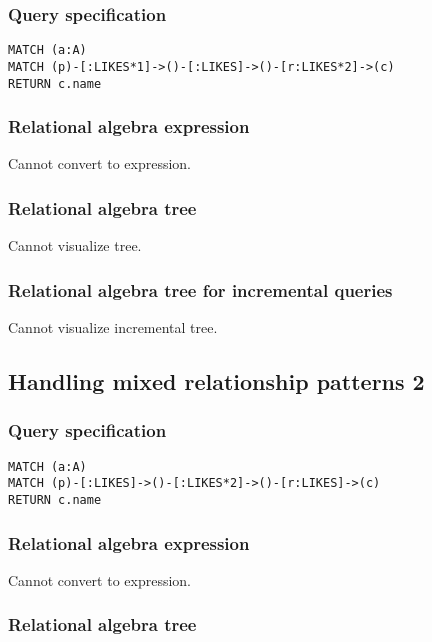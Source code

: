 \subsubsection*{Query specification}

\begin{lstlisting}
MATCH (a:A)
MATCH (p)-[:LIKES*1]->()-[:LIKES]->()-[r:LIKES*2]->(c)
RETURN c.name
\end{lstlisting}

\subsubsection*{Relational algebra expression}

Cannot convert to expression.

\subsubsection*{Relational algebra tree}

Cannot visualize tree.

\subsubsection*{Relational algebra tree for incremental queries}

Cannot visualize incremental tree.

\subsection{Handling mixed relationship patterns 2}

\subsubsection*{Query specification}

\begin{lstlisting}
MATCH (a:A)
MATCH (p)-[:LIKES]->()-[:LIKES*2]->()-[r:LIKES]->(c)
RETURN c.name
\end{lstlisting}

\subsubsection*{Relational algebra expression}

Cannot convert to expression.

\subsubsection*{Relational algebra tree}

